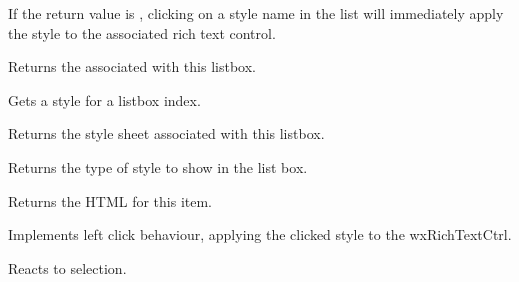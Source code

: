 If the return value is \true, clicking on a style name in the list will immediately
apply the style to the associated rich text control.

\label{wxrichtextstylelistboxgetrichtextctrl}


Returns the  associated with this listbox.

\label{wxrichtextstylelistboxgetstyle}


Gets a style for a listbox index.

\label{wxrichtextstylelistboxgetstylesheet}


Returns the style sheet associated with this listbox.

\label{wxrichtextstylelistboxgetstyletype}


Returns the type of style to show in the list box.

\label{wxrichtextstylelistboxongetitem}


Returns the HTML for this item.

\label{wxrichtextstylelistboxonleftdown}


Implements left click behaviour, applying the clicked style to the wxRichTextCtrl.

\label{wxrichtextstylelistboxonselect}


Reacts to selection.

\label{wxrichtextstylelistboxsetapplyonselection}

